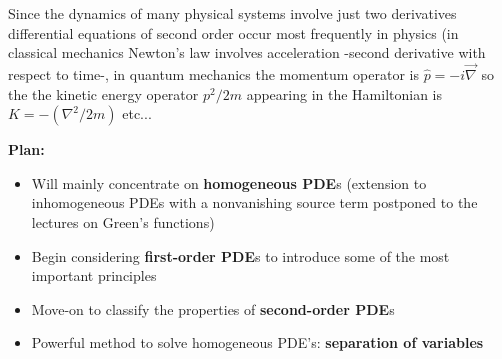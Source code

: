 \documentclass{article}
\begin{document}
\noindent
Since the dynamics of many physical systems involve just two derivatives differential equations of second order occur most frequently in physics (in classical mechanics Newton’s law involves acceleration -second derivative with respect to time-, in quantum mechanics the momentum operator is $\hat{p} = -i \vec{\nabla}$ so the the kinetic energy operator $p^2 / 2m$ appearing in the Hamiltonian is $K = - (\nabla^2 / 2m)$ etc...

\vspace{2mm} \noindent
\textbf{Plan:}

\begin{itemize}
    \item Will mainly concentrate on \textbf{homogeneous PDE}s (extension to inhomogeneous PDEs with a nonvanishing source term postponed to the lectures on Green’s functions)
    \item Begin considering \textbf{first-order PDE}s to introduce some of the most important principles
    \item Move-on to classify the properties of \textbf{second-order PDE}s
    \item Powerful method to solve homogeneous PDE’s: \textbf{separation of variables}
\end{itemize}
\end{document}
